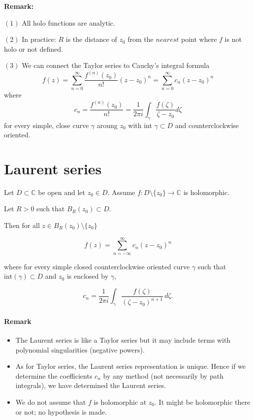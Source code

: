 \textbf{Remark:}

$(1)$ All holo functions are analytic. 

$(2)$ In practice: $R$ is the distance of $z_0$ from the $nearest$ point where $f$ is not holo or not defined. 

$(3)$ We can connect the Taylor series to Cauchy's integral formula \[
  f(z) = \sum_{n = 0}^{\infty} \frac{f^{\left(n\right)}(z_0)}{n!}(z-z_0)^n = \sum_{n=0}^{\infty}c_n(z-z_0)^n 
\]
where \[
  c_n = \frac{f^{\left(n\right)}(z_0)}{n!} = \frac{1}{2 \pi i}\int_{\gamma} \frac{f(\zeta)}{\zeta - z_0} d\zeta
\]
for every simple, close curve $\gamma$ aroung $z_0$ with int $\gamma \subset D$ and counterclockwise oriented.
\section{Laurent series}

\begin{theorem}
 Let $D \subset \mathbb{C}$ be open and let $z_0 \in D$.  
Assume $f : D \setminus \{z_0\} \to \mathbb{C}$ is holomorphic.

Let $R>0$ such that $B_R(z_0) \subset D$.

Then for all $z \in B_R(z_0)\setminus\{z_0\}$

\[
f(z)=\sum_{n=-\infty}^{\infty} c_n (z-z_0)^n
\]

where for every simple closed counterclockwise oriented curve $\gamma$
such that $\mathrm{int}(\gamma)\subset D$ and $z_0$ is enclosed by $\gamma$,

\[
c_n=\frac{1}{2\pi i}\int_\gamma
\frac{f(\zeta)}{(\zeta-z_0)^{n+1}}\,d\zeta .
\]

\end{theorem}
\paragraph{Remark}

\begin{itemize}

\item The Laurent series is like a Taylor series but it may include
terms with polynomial singularities (negative powers).

\item As for Taylor series, the Laurent series representation is unique.
Hence if we determine the coefficients $c_n$ by any method
(not necessarily by path integrals), we have determined the Laurent series.

\item We do not assume that $f$ is holomorphic at $z_0$.
It might be holomorphic there or not; no hypothesis is made.

\end{itemize}

